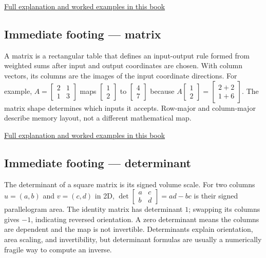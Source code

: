 \hyperref[01-foundations-i-ch017-numbers-become-a-system-of-permitted-operations]{Full explanation and worked examples in this book}

\subsection{Immediate footing --- matrix}\label{01-foundations-i-ch018-immediate-footing-matrix}

A matrix is a rectangular table that defines an input-output rule formed from weighted sums after input and output coordinates are chosen. With column vectors, its columns are the images of the input coordinate directions. For example, \(A=\begin{bmatrix}2&1\\1&3\end{bmatrix}\) maps \(\begin{bmatrix}1\\2\end{bmatrix}\) to \(\begin{bmatrix}4\\7\end{bmatrix}\) because \(A\begin{bmatrix}1\\2\end{bmatrix}=\begin{bmatrix}2+2\\1+6\end{bmatrix}\). The matrix shape determines which inputs it accepts. Row-major and column-major describe memory layout, not a different mathematical map.

\hyperref[01-foundations-i-ch018]{Full explanation and worked examples in this book}

\subsection{Immediate footing --- determinant}\label{01-foundations-i-ch018-immediate-footing-determinant}

The determinant of a square matrix is its signed volume scale. For two columns \(u=(a,b)\) and \(v=(c,d)\) in 2D, \(\det\begin{bmatrix}a&c\\b&d\end{bmatrix}=ad-bc\) is their signed parallelogram area. The identity matrix has determinant \(1\); swapping its columns gives \(-1\), indicating reversed orientation. A zero determinant means the columns are dependent and the map is not invertible. Determinants explain orientation, area scaling, and invertibility, but determinant formulas are usually a numerically fragile way to compute an inverse.

